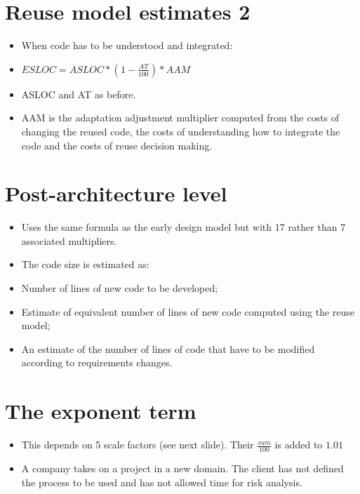 \section{Reuse model estimates 2}
\begin{itemize}

\item When code has to be understood and integrated:
  \item $ESLOC = ASLOC * (1-\frac{AT}{100}) * AAM$
  \item ASLOC and AT as before.

  \item AAM is the adaptation adjustment multiplier computed from the costs of changing the reused code, the costs of understanding how to integrate the code and the costs of reuse decision making.
\end{itemize}
 \section{Post-architecture level}
 \begin{itemize}

\item Uses the same formula as the early design model but with 17 rather than 7 associated multipliers.

\item The code size is estimated as:

  \item Number of lines of new code to be developed;

  \item Estimate of equivalent number of lines of new code computed using the reuse model;
  \item An estimate of the number of lines of code that have to be modified according to requirements changes.
\end{itemize}
\section{The exponent term}
\begin{itemize}

\item This depends on 5 scale factors (see next slide). Their $\frac{sum}{100}$ is added to $1.01$

\item A company takes on a project in a new domain. The client has not defined the process to be used and has not allowed time for risk analysis. \end{itemize}
